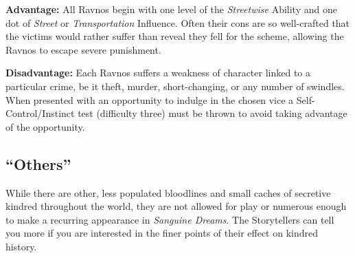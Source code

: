 \textbf{Advantage:}  All Ravnos begin with one level of the \emph{Streetwise} Ability and 
one dot of \emph{Street} or \emph{Transportation} Influence.   Often their cons are so 
well-crafted that the victims would rather suffer than reveal they fell for the scheme, 
allowing the Ravnos to escape severe punishment.

\textbf{Disadvantage:}  Each Ravnos suffers a weakness of character linked to a 
particular crime, be it theft, murder, short-changing, or any number of swindles.  
When presented with an opportunity to indulge in the chosen vice a 
Self-Control/Instinct test (difficulty three) must be thrown to avoid taking advantage 
of the opportunity.

\subsection{``Others''}
While there are other, less populated bloodlines and small caches of secretive kindred 
throughout the world, they are not allowed for play or numerous enough to make a 
recurring appearance in \emph{Sanguine Dreams}.  The Storytellers can tell you more 
if you are interested in the finer points of their effect on kindred history.
